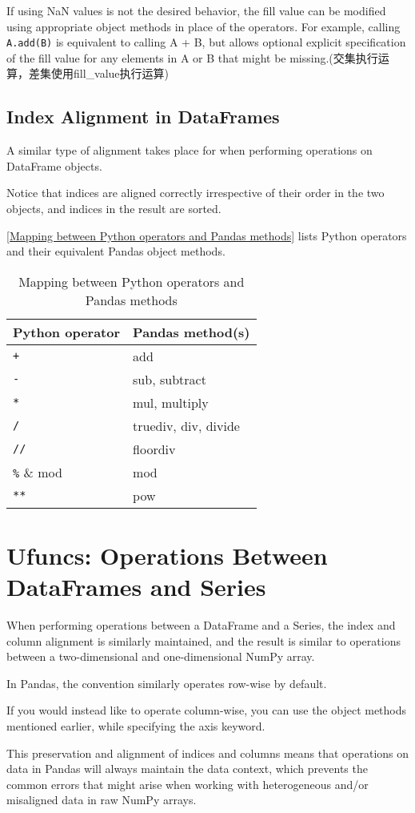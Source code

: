 If using NaN values is not the desired behavior, the fill value can be modified using
appropriate object methods in place of the operators. For example, calling \verb|A.add(B)|
is equivalent to calling A + B, but allows optional explicit specification of the fill value
for any elements in A or B that might be missing.(交集执行运算，差集使用fill\_value执行运算)

\subsection*{Index Alignment in DataFrames}

A similar type of alignment takes place for  when performing operations on DataFrame objects.

Notice that indices are aligned correctly irrespective of their order in the two objects,
and indices in the result are sorted.

\autoref{Mapping between Python operators and Pandas methods} lists Python operators and their equivalent Pandas object methods.

\begin{table}
    \centering
    \caption{Mapping between Python operators and Pandas methods}
    \label{Mapping between Python operators and Pandas methods}
    \begin{tabular}{ll}
        \hline
        Python operator & Pandas method(s)     \\
        \hline
        \verb|+|        & add                  \\
        \verb|-|        & sub, subtract        \\
        \verb|*|        & mul, multiply        \\
        \verb|/|        & truediv, div, divide \\
        \verb|//|       & floordiv             \\
        \verb|%|        & mod                  \\
        \verb|**|       & pow                  \\
        \hline
    \end{tabular}
\end{table}
\section{Ufuncs: Operations Between DataFrames and Series}
When performing operations between a DataFrame and a Series, the index and column alignment is similarly maintained, and the result is similar to operations
between a two-dimensional and one-dimensional NumPy array.

In Pandas, the convention similarly operates row-wise by default.

If you would instead like to operate column-wise, you can use the object methods
mentioned earlier, while specifying the axis keyword.

This preservation and alignment of indices and columns means that operations on
data in Pandas will always maintain the data context, which prevents the common
errors that might arise when working with heterogeneous and/or misaligned data in
raw NumPy arrays.
